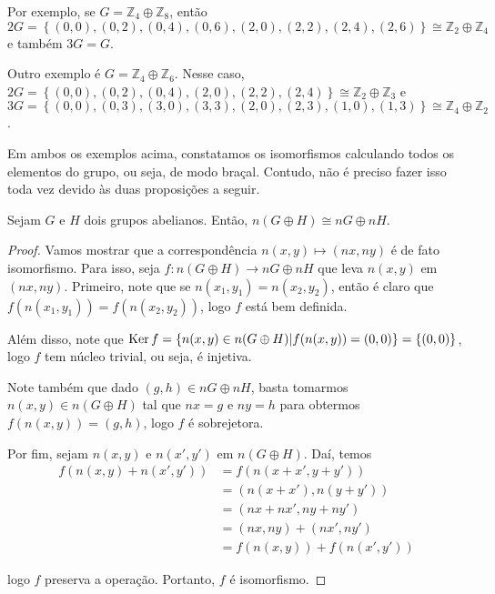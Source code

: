     	\par\vspace{0.3cm} Por exemplo, se $G = \mathbb{Z}_4\oplus\mathbb{Z}_8$, então 
    	$2G = \left\{ (0,0), (0,2), (0,4), (0,6), (2,0), (2,2), (2,4), (2, 6) \right\}
    	\cong \mathbb{Z}_2\oplus\mathbb{Z}_4$ e também $3G=G$. 
    	
    	\par\vspace{0.3cm} Outro exemplo é $G = \mathbb{Z}_4\oplus\mathbb{Z}_6$. Nesse caso, 
    	$2G = \left\{ (0,0), (0,2), (0,4), (2,0), (2,2), (2,4) \right\}
    	\cong \mathbb{Z}_2\oplus\mathbb{Z}_3$ e 
    	$3G = \left\{ (0,0), (0,3), (3,0), (3,3), (2,0), (2,3), (1,0), (1,3) \right\}
    	\cong \mathbb{Z}_4\oplus\mathbb{Z}_2$. 
    	
    	\par\vspace{0.3cm} Em ambos os exemplos acima, constatamos os isomorfismos calculando todos os 
    	elementos do grupo, ou seja, de modo braçal. Contudo, não é preciso fazer isso toda vez devido 
    	às duas proposições a seguir.
    	\begin{prop}
    	\label{subgrupo abeliano nG}
    		Sejam $G$ e $H$ dois grupos abelianos. Então, $n(G\oplus H)\cong nG\oplus nH$.
    	\end{prop}
    	\begin{proof}
    		Vamos mostrar que a correspondência $n(x,y)\mapsto(nx,ny)$ é de fato isomorfismo. 
    		Para isso, seja $f: n(G\oplus H)\to nG\oplus nH$ que leva $n(x,y)$ em $(nx,ny)$. Primeiro, 
    		note que se $n(x_1,y_1) = n(x_2,y_2)$, então é claro que $f(n(x_1,y_1)) = f(n(x_2,y_2))$, 
    		logo $f$ está bem definida.
    		
    		\par\vspace{0.3cm} Além disso, note que 
    		$\operatorname{Ker} f = \left\{ n(x,y)\in n(G\oplus H)\vert f( n(x,y) ) = (0,0) \right\} = \left\{ (0,0) \right\}$,
    		logo $f$ tem núcleo trivial, ou seja, é injetiva.
    		
    		\par\vspace{0.3cm} Note também que dado $(g,h)\in nG\oplus nH$, basta tomarmos 
    		$n(x,y)\in n(G\oplus H)$ tal que $nx = g$ e $ny = h$ para obtermos $f(n(x,y)) = (g,h)$, 
    		logo $f$ é sobrejetora.
    		
    		\par\vspace{0.3cm} Por fim, sejam $n(x,y)$ e $n(x',y')$ em $n(G\oplus H)$. Daí, temos
    		\begin{align*}
    		    f( n(x,y) + n(x',y') ) &= f( n(x+x', y+y') ) \\ 
    		    &= ( n(x+x'), n(y+y') ) \\ 
    		    &= (nx + nx', ny + ny') \\ 
    		    &= (nx, ny) + (nx', ny') \\ 
    		    &= f(n(x,y)) + f(n(x',y'))
    		\end{align*}
    		\par\vspace{0.3cm} logo $f$ preserva a operação. Portanto, $f$ é isomorfismo.
    	\end{proof}
